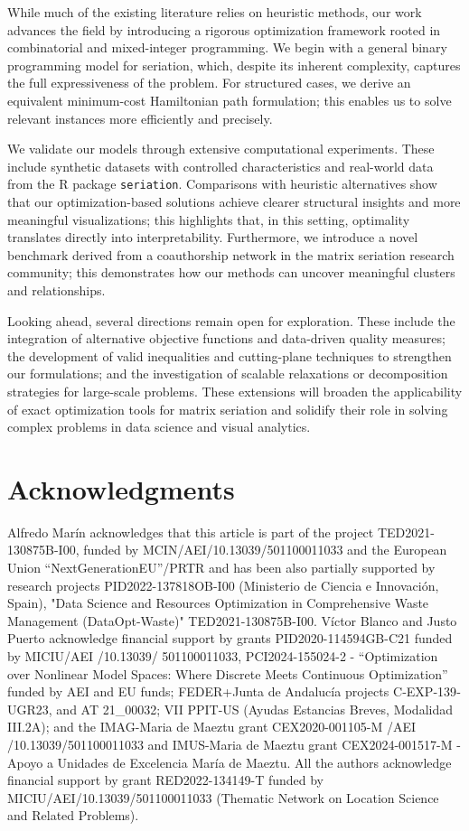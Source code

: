 \documentclass[a4paper,11pt, reqno]{amsart}
\begin{document}
While much of the existing literature relies on heuristic methods, our work advances the field by introducing a rigorous optimization framework rooted in combinatorial and mixed-integer programming. We begin with a general binary programming model for seriation, which, despite its inherent complexity, captures the full expressiveness of the problem. For structured cases, we derive an equivalent minimum-cost Hamiltonian path formulation; this enables us to solve relevant instances more efficiently and precisely.

We validate our models through extensive computational experiments. These include synthetic datasets with controlled characteristics and real-world data from the R package \texttt{seriation}. Comparisons with heuristic alternatives show that our optimization-based solutions achieve clearer structural insights and more meaningful visualizations; this highlights that, in this setting, optimality translates directly into interpretability. Furthermore, we introduce a novel benchmark derived from a coauthorship network in the matrix seriation research community; this demonstrates how our methods can uncover meaningful clusters and relationships.

Looking ahead, several directions remain open for exploration. These include the integration of alternative objective functions and data-driven quality measures; the development of valid inequalities and cutting-plane techniques to strengthen our formulations; and the investigation of scalable relaxations or decomposition strategies for large-scale problems. These extensions will broaden the applicability of exact optimization tools for matrix seriation and solidify their role in solving complex problems in data science and visual analytics.

\section*{Acknowledgments}

Alfredo Mar\'in acknowledges that this article is part of the project TED2021-130875B-I00, 
funded by MCIN/AEI/10.13039/501100011033 and the European Union “NextGenerationEU”/PRTR
and has been also partially supported by research projects PID2022-137818OB-I00 (Ministerio
de Ciencia e Innovaci\'on, Spain), "Data Science and Resources Optimization in Comprehensive Waste Management (DataOpt-Waste)" 
TED2021-130875B-I00. V\'ictor Blanco and Justo Puerto acknowledge financial support by  grants PID2020-114594GB-C21 funded by MICIU/AEI /10.13039/ 501100011033, PCI2024-155024-2 - ``Optimization over Nonlinear Model Spaces: Where Discrete Meets Continuous Optimization'' funded by AEI and EU funds; FEDER+Junta de Andalucía projects C‐EXP‐139‐UGR23, and AT 21\_00032; VII PPIT-US (Ayudas Estancias Breves, Modalidad III.2A); and the IMAG-Maria de Maeztu grant CEX2020-001105-M /AEI /10.13039/501100011033 and IMUS-Maria de Maeztu grant CEX2024-001517-M - Apoyo a Unidades de Excelencia María de Maeztu. All the authors acknowledge financial support by grant RED2022-134149-T funded by MICIU/AEI/10.13039/501100011033 (Thematic Network on Location Science and Related Problems).
\end{document}
